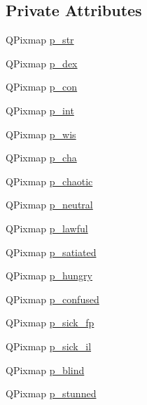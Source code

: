 \subsection*{Private Attributes}
\begin{DoxyCompactItemize}
\item 
Q\+Pixmap \hyperlink{classNetHackQtStatusWindow_a60609089200e45ad3d0717e9fc0f5f7e}{p\+\_\+str}
\item 
Q\+Pixmap \hyperlink{classNetHackQtStatusWindow_a4dbea91b6a1442706721f60296f5d2e2}{p\+\_\+dex}
\item 
Q\+Pixmap \hyperlink{classNetHackQtStatusWindow_ae0325327747e7bad2d499ec5d597c829}{p\+\_\+con}
\item 
Q\+Pixmap \hyperlink{classNetHackQtStatusWindow_afad056ddb53c609ffd53c6f609456bbc}{p\+\_\+int}
\item 
Q\+Pixmap \hyperlink{classNetHackQtStatusWindow_a6267aa499ffecc5df99fd6935ed0bae2}{p\+\_\+wis}
\item 
Q\+Pixmap \hyperlink{classNetHackQtStatusWindow_abf918784c0eeb462cd89d5325ef7499e}{p\+\_\+cha}
\item 
Q\+Pixmap \hyperlink{classNetHackQtStatusWindow_a2f4fe3698d203956d5d49ee666cbe2b2}{p\+\_\+chaotic}
\item 
Q\+Pixmap \hyperlink{classNetHackQtStatusWindow_ac34e439730c33614876381efb3e545ec}{p\+\_\+neutral}
\item 
Q\+Pixmap \hyperlink{classNetHackQtStatusWindow_a51952058ee0062a27d0d9f3a8f0b114b}{p\+\_\+lawful}
\item 
Q\+Pixmap \hyperlink{classNetHackQtStatusWindow_a172ccb053e214f7600749b68624099c2}{p\+\_\+satiated}
\item 
Q\+Pixmap \hyperlink{classNetHackQtStatusWindow_a8b526df074a2861e66adc1333c969f00}{p\+\_\+hungry}
\item 
Q\+Pixmap \hyperlink{classNetHackQtStatusWindow_a628dc95a8a1201590d3d01e1b12ca322}{p\+\_\+confused}
\item 
Q\+Pixmap \hyperlink{classNetHackQtStatusWindow_a3c53e5af6e1065e0d513849fad7d6123}{p\+\_\+sick\+\_\+fp}
\item 
Q\+Pixmap \hyperlink{classNetHackQtStatusWindow_a931ec3363e355478723d41909b6f5ff8}{p\+\_\+sick\+\_\+il}
\item 
Q\+Pixmap \hyperlink{classNetHackQtStatusWindow_ab22890e43586c1762a8944a76c7018cf}{p\+\_\+blind}
\item 
Q\+Pixmap \hyperlink{classNetHackQtStatusWindow_acda1675d5647d69e66284a1df78b5d78}{p\+\_\+stunned}
\item 

\end{DoxyCompactItemize}
